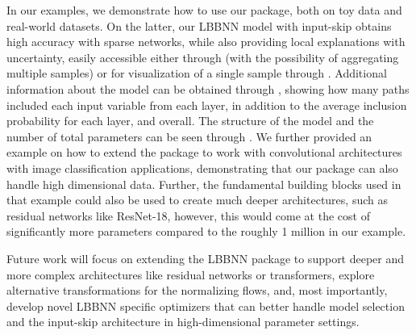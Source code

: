 In our examples, we demonstrate how to use our package, both on toy data and real-world datasets. On the latter, our LBBNN model with input-skip obtains high accuracy with sparse networks, while also providing local explanations with uncertainty, easily accessible either through  (with the possibility of aggregating multiple samples) or for visualization of a single sample through . Additional information about the model can be obtained through , showing how many paths included each input variable from each layer, in addition to the average inclusion probability for each layer, and overall. The structure of the model and the number of total parameters can be seen through . We further provided an example on how to extend the package to work with convolutional architectures with image classification applications, demonstrating that our package can also handle high dimensional data. Further, the fundamental building blocks used in that example could also be used to create much deeper architectures, such as residual networks like ResNet-18, however, this would come at the cost of significantly more parameters compared to the roughly 1 million in our example.

Future work will focus on extending the LBBNN package to support deeper and more complex architectures like residual networks or transformers, explore alternative transformations for the normalizing flows, and, most importantly, develop novel LBBNN specific optimizers that can better handle model selection and the input-skip architecture in high-dimensional parameter settings.



\address{Lars Skaaret-Lund\\
  KBM, Bioinformatics and applied statistics (BIAS),
Norwegian University of Life Sciences\\
  Elizabeth Stephansens v. 15, 1433 Ås\\
  Norway
  \\
  }

\address{Eirik Høyheim\\
  KBM, Bioinformatics and applied statistics (BIAS),
Norwegian University of Life Sciences\\
  Elizabeth Stephansens v. 15, 1433 Ås\\
  Norway\\
  }

\address{Aliaksandr Hubin\\
   KBM, Bioinformatics and applied statistics (BIAS),
Norwegian University of Life Sciences\\
  Elizabeth Stephansens v. 15, 1433 Ås\\
  Norway\\
  }
